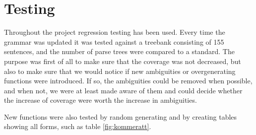 \documentclass{report}
\begin{document}
\section{Testing}
Throughout the project regression testing has been used. Every time the grammar was updated
it was tested against a treebank consisting of 155 sentences, and the number of
parse trees were compared to a standard.
The purpose was first of all to
make sure that the coverage was not decreased, but also to make sure that we
would notice if new ambiguities or overgenerating functions were introduced.
If so, the ambiguities could be removed when possible, and when not, we were at least made
aware of them and could decide whether the increase of coverage were worth the
increase in ambiguities.

New functions were also tested by random generating and by creating tables showing
all forms, such as table \ref{fig:kommeratt}.



\end{document}
